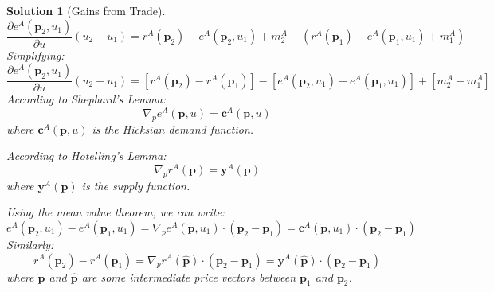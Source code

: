 \documentclass[a4paper,12pt]{article} %
\theoremstyle{nonitalic}
\newtheorem{solution}{Solution}
\begin{document}
\begin{solution}[Gains from Trade]
\begin{equation}
        \frac{\partial e^A(\mathbf{p}_2, u_1)}{\partial u}(u_2 - u_1) = r^A(\mathbf{p}_2) - e^A(\mathbf{p}_2, u_1) + m^A_2 - (r^A(\mathbf{p}_1) - e^A(\mathbf{p}_1, u_1) + m^A_1) \tag{5}
    \end{equation}
    Simplifying:
    \begin{equation}
        \frac{\partial e^A(\mathbf{p}_2, u_1)}{\partial u}(u_2 - u_1) = [r^A(\mathbf{p}_2) - r^A(\mathbf{p}_1)] - [e^A(\mathbf{p}_2, u_1) - e^A(\mathbf{p}_1, u_1)] + [m^A_2 - m^A_1] \tag{6}
    \end{equation}
    According to Shephard's Lemma:
    \begin{equation}
        \nabla_p e^A(\mathbf{p}, u) = \mathbf{c}^A(\mathbf{p}, u) \tag{7}
    \end{equation}
    where $\mathbf{c}^A(\mathbf{p}, u)$ is the Hicksian demand function.

    According to Hotelling's Lemma:
    \begin{equation}
        \nabla_p r^A(\mathbf{p}) = \mathbf{y}^A(\mathbf{p}) \tag{8}
    \end{equation}
    where $\mathbf{y}^A(\mathbf{p})$ is the supply function.

    Using the mean value theorem, we can write:
    \begin{equation}
    e^A(\mathbf{p}_2, u_1) - e^A(\mathbf{p}_1, u_1) = \nabla_p e^A(\mathbf{\tilde{p}}, u_1) \cdot (\mathbf{p}_2 - \mathbf{p}_1) = \mathbf{c}^A(\mathbf{\tilde{p}}, u_1) \cdot (\mathbf{p}_2 - \mathbf{p}_1) \tag{9}
    \end{equation}
    Similarly:
    \begin{equation}
    r^A(\mathbf{p}_2) - r^A(\mathbf{p}_1) = \nabla_p r^A(\mathbf{\hat{p}}) \cdot (\mathbf{p}_2 - \mathbf{p}_1) = \mathbf{y}^A(\mathbf{\hat{p}}) \cdot (\mathbf{p}_2 - \mathbf{p}_1) \tag{10}
    \end{equation}
    where $\mathbf{\tilde{p}}$ and $\mathbf{\hat{p}}$ are some intermediate price vectors between $\mathbf{p}_1$ and $\mathbf{p}_2$.


\end{solution}
\end{document}
